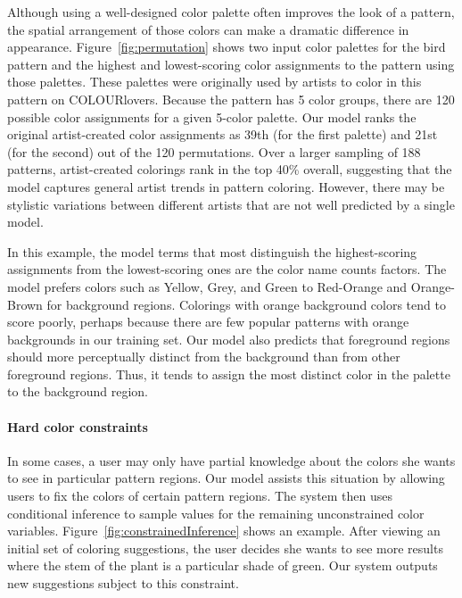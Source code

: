 Although using a well-designed color palette often improves the look of a pattern, the spatial arrangement of those colors can make a dramatic difference in appearance. Figure~\ref{fig:permutation} shows two input color palettes for the bird pattern and the highest and lowest-scoring color assignments to the pattern using those palettes. These palettes were originally used by artists to color in this pattern on COLOURlovers. Because the pattern has 5 color groups, there are 120 possible color assignments for a given 5-color palette. Our model ranks the original artist-created color assignments as 39th (for the first palette) and 21st (for the second) out of the 120 permutations. Over a larger sampling of 188 patterns, artist-created colorings rank in the top 40\% overall, suggesting that the model captures general artist trends in pattern coloring. However, there may be stylistic variations between different artists that are not well predicted by a single model.

In this example, the model terms that most distinguish the highest-scoring assignments from the lowest-scoring ones are the color name counts factors. The model prefers colors such as Yellow, Grey, and Green to Red-Orange and Orange-Brown for background regions. Colorings with orange background colors tend to score poorly, perhaps because there are few popular patterns with orange backgrounds in our training set.
Our model also predicts that foreground regions should more perceptually distinct from the background than from other foreground regions. Thus, it tends to assign the most distinct color in the palette to the background region.


\paragraph{Hard color constraints}

In some cases, a user may only have partial knowledge about the colors she wants to see in particular pattern regions. Our model assists this situation by allowing users to fix the colors of certain pattern regions. The system then uses conditional inference to sample values for the remaining unconstrained color variables. Figure~\ref{fig:constrainedInference} shows an example. After viewing an initial set of coloring suggestions, the user decides she wants to see more results where the stem of the plant is a particular shade of green. Our system outputs new suggestions subject to this constraint.

